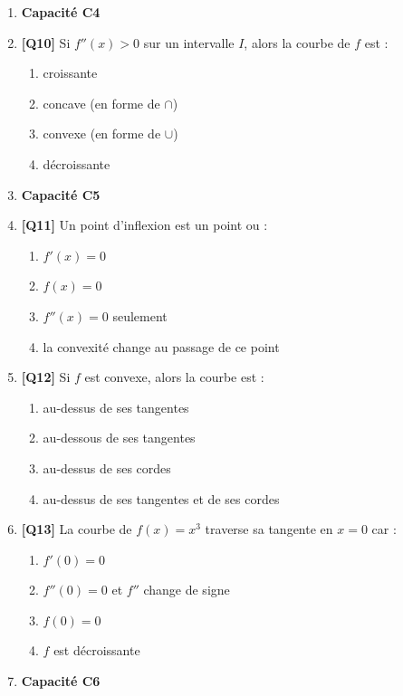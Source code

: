 \begin{enumerate}
\item[] \textbf{Capacité C4}

\item \textbf{[Q10]} Si $f''(x) > 0$ sur un intervalle $I$, alors la courbe de $f$ est :
  \begin{enumerate}[label=\Alph*.]
    \item croissante
    \item concave (en forme de $\cap$)
    \item convexe (en forme de $\cup$)
    \item décroissante
  \end{enumerate}

\item[] \textbf{Capacité C5}

\item \textbf{[Q11]} Un point d'inflexion est un point ou :
  \begin{enumerate}[label=\Alph*.]
    \item $f'(x) = 0$
    \item $f(x) = 0$
    \item $f''(x) = 0$ seulement
    \item la convexité change au passage de ce point
  \end{enumerate}

\item \textbf{[Q12]} Si $f$ est convexe, alors la courbe est :
  \begin{enumerate}[label=\Alph*.]
    \item au-dessus de ses tangentes
    \item au-dessous de ses tangentes
    \item au-dessus de ses cordes
    \item au-dessus de ses tangentes et de ses cordes
  \end{enumerate}

\item \textbf{[Q13]} La courbe de $f(x) = x^3$ traverse sa tangente en $x = 0$ car :
  \begin{enumerate}[label=\Alph*.]
    \item $f'(0) = 0$
    \item $f''(0) = 0$ et $f''$ change de signe
    \item $f(0) = 0$
    \item $f$ est décroissante
  \end{enumerate}

\item[] \textbf{Capacité C6}


\end{enumerate}
